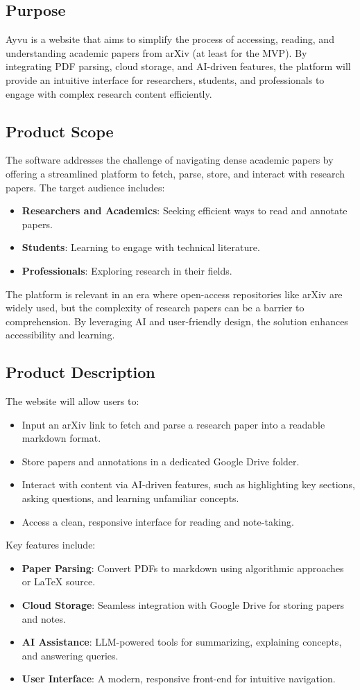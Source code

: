 \documentclass[12pt]{article}
\begin{document}
\subsection{Purpose}
Ayvu is a website that aims to simplify the process of accessing, reading, and understanding academic papers from arXiv (at least for the MVP). By integrating PDF parsing, cloud storage, and AI-driven features, the platform will provide an intuitive interface for researchers, students, and professionals to engage with complex research content efficiently.

\subsection{Product Scope}
The software addresses the challenge of navigating dense academic papers by offering a streamlined platform to fetch, parse, store, and interact with research papers. The target audience includes:
\begin{itemize}
  \item \textbf{Researchers and Academics}: Seeking efficient ways to read and annotate papers.
  \item \textbf{Students}: Learning to engage with technical literature.
  \item \textbf{Professionals}: Exploring research in their fields.
\end{itemize}
The platform is relevant in an era where open-access repositories like arXiv are widely used, but the complexity of research papers can be a barrier to comprehension. By leveraging AI and user-friendly design, the solution enhances accessibility and learning.

\subsection{Product Description}
The website will allow users to:
\begin{itemize}
  \item Input an arXiv link to fetch and parse a research paper into a readable markdown format.
  \item Store papers and annotations in a dedicated Google Drive folder.
  \item Interact with content via AI-driven features, such as highlighting key sections, asking questions, and learning unfamiliar concepts.
  \item Access a clean, responsive interface for reading and note-taking.
\end{itemize}
Key features include:
\begin{itemize}
  \item \textbf{Paper Parsing}: Convert PDFs to markdown using algorithmic approaches or LaTeX source.
  \item \textbf{Cloud Storage}: Seamless integration with Google Drive for storing papers and notes.
  \item \textbf{AI Assistance}: LLM-powered tools for summarizing, explaining concepts, and answering queries.
  \item \textbf{User Interface}: A modern, responsive front-end for intuitive navigation.
\end{itemize}
\end{document}
